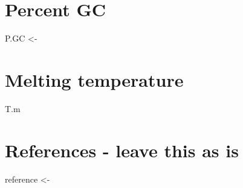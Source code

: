 \documentclass[
]{book}
\begin{document}
\hypertarget{percent-gc}{%
\chapter{Percent GC}\label{percent-gc}}

P.GC \textless-

\hypertarget{melting-temperature}{%
\chapter{Melting temperature}\label{melting-temperature}}

T.m

\hypertarget{references---leave-this-as-is}{%
\chapter{References - leave this as is}\label{references---leave-this-as-is}}

reference \textless-
\end{document}
